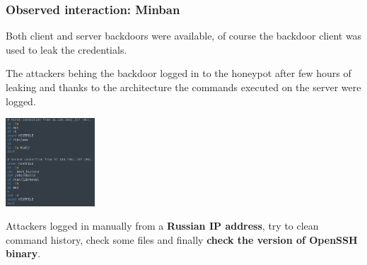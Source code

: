 \begin{frame}
	\frametitle{Observed interaction: Minban}
	
	Both client and server backdoors were available, of course the backdoor client was used to leak the credentials.
	
	\smallskip
	
	The attackers behing the backdoor logged in to the honeypot after few hours of leaking and thanks to the architecture the commands executed on the server were logged.
	
	\smallskip
	
  \begin{center}    
  \includegraphics[width=0.25\textwidth]{images/minban}
  \end{center}
  
	\smallskip
	
  Attackers logged in manually from a \textbf{Russian IP address}, try to clean command history, check some files and finally \textbf{check the version of OpenSSH binary}.  

\end{frame}


